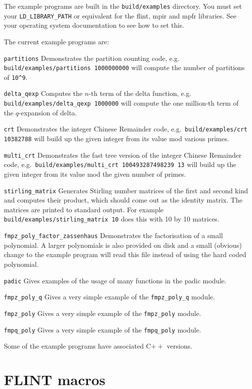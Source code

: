 \documentclass[a4paper,10pt]{book}
\newcommand{\code}{\lstinline}
\begin{document}
The example programs are built in the \code{build/examples} directory.
You must set your \code{LD_LIBRARY_PATH} or equivalent for the flint, mpir
and mpfr libraries. See your operating system documentation to see how to
set this.

The current example programs are:

\code{partitions} Demonstrates the partition counting code, e.g.\\
\code{build/examples/partitions 1000000000} will compute the number of
partitions of \code{10^9}.

\code{delta_qexp}  Computes the $n$-th term of the delta function, e.g.\\
\code{build/examples/delta_qexp 1000000} will compute the one million-th
term of the $q$-expansion of delta.

\code{crt}  Demonstrates the integer Chinese Remainder code, e.g.\
\code{build/examples/crt 10382788} will build up the given integer from
its value mod various primes.

\code{multi_crt}  Demonstrates the fast tree version of the integer Chinese
Remainder code, e.g.\
\code{build/examples/multi_crt 100493287498239 13} will build up the given
integer from its value mod the given number of primes.

\code{stirling_matrix}  Generates Stirling number matrices of the first
and second kind and computes their product, which should come out as the
identity matrix. The matrices are printed to standard output.
For example \code{build/examples/stirling_matrix 10} does this
with 10 by 10 matrices.

\code{fmpz_poly_factor_zassenhaus} Demonstrates the factorisation of a
small polynomial. A larger polynomials is also provided on disk and a
small (obvious) change to the example program will read this file instead
of using the hard coded polynomial.

\code{padic} Gives examples of the usage of many functions in the padic
module.

\code{fmpz_poly_q} Gives a very simple example of the \code{fmpz_poly_q}
module.

\code{fmpz_poly} Gives a very simple example of the \code{fmpz_poly}
module.

\code{fmpq_poly} Gives a very simple example of the \code{fmpq_poly}
module.

Some of the example programs have associated C$++$ versions.

\chapter{FLINT macros}
\end{document}
